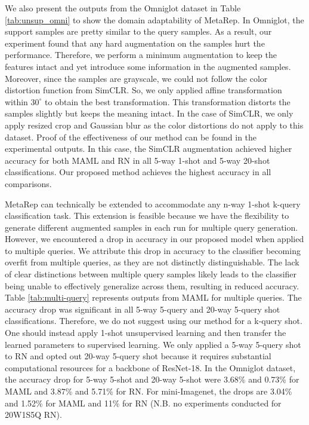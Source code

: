 We also present the outputs from the Omniglot dataset in Table \ref{tab:unsup_omni} to show the domain adaptability of MetaRep. In Omniglot, the support samples are pretty similar to the query samples. As a result, our experiment found that any hard augmentation on the samples hurt the performance. Therefore, we perform a minimum augmentation to keep the features intact and yet introduce some information in the augmented samples. Moreover, since the samples are grayscale, we could not follow the color distortion function from SimCLR. So, we only applied affine transformation within $30^{\circ}$ to obtain the best transformation. This transformation distorts the samples slightly but keeps the meaning intact. In the case of SimCLR, we only apply resized crop and Gaussian blur as the color distortions do not apply to this dataset. Proof of the effectiveness of our method can be found in the experimental outputs. In this case, the SimCLR augmentation achieved higher accuracy for both MAML and RN in all 5-way 1-shot and 5-way 20-shot classifications. Our proposed method achieves the highest accuracy in all comparisons.

MetaRep can technically be extended to accommodate any n-way 1-shot k-query classification task. This extension is feasible because we have the flexibility to generate different augmented samples in each run for multiple query generation. However, we encountered a drop in accuracy in our proposed model when applied to multiple queries. We attribute this drop in accuracy to the classifier becoming overfit from multiple queries, as they are not distinctly distinguishable. The lack of clear distinctions between multiple query samples likely leads to the classifier being unable to effectively generalize across them, resulting in reduced accuracy. Table \ref{tab:multi-query} represents outputs from MAML for multiple queries. The accuracy drop was significant in all 5-way 5-query and 20-way 5-query shot classifications. Therefore, we do not suggest using our method for a k-query shot. One should instead apply 1-shot unsupervised learning and then transfer the learned parameters to supervised learning. We only applied a 5-way 5-query shot to RN and opted out 20-way 5-query shot because it requires substantial computational resources for a backbone of ResNet-18. In the Omniglot dataset, the accuracy drop for 5-way 5-shot and 20-way 5-shot were 3.68\% and 0.73\% for MAML and 3.87\% and 5.71\% for RN. For mini-Imagenet, the drops are 3.04\% and 1.52\% for MAML and 11\% for RN (N.B. no experiments conducted for 20W1S5Q RN).

